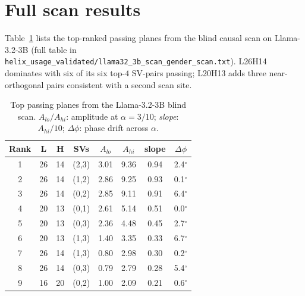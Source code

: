 \section{Full scan results}
\label{app:scan}

Table~\ref{tab:llama_top_planes} lists the top-ranked passing planes
from the blind causal scan on Llama-3.2-3B (full table in
\texttt{helix\_usage\_validated/llama32\_3b\_scan\_gender\_scan.txt}).
L26H14 dominates with six of its six top-$4$ SV-pairs passing; L20H13
adds three near-orthogonal pairs consistent with a second scan site.

\begin{table}[h]
\centering
\small
\caption{Top passing planes from the Llama-3.2-3B blind scan.
$A_{lo}/A_{hi}$: amplitude at $\alpha = 3/10$; \emph{slope}: $A_{hi}/10$;
$\Delta\phi$: phase drift across $\alpha$.}
\label{tab:llama_top_planes}
\begin{tabular}{cccccccc}
\toprule
Rank & L & H & SVs & $A_{lo}$ & $A_{hi}$ & slope & $\Delta\phi$ \\
\midrule
1 & 26 & 14 & (2,3) & 3.01 & 9.36 & 0.94 & 2.4$^\circ$ \\
2 & 26 & 14 & (1,2) & 2.86 & 9.25 & 0.93 & 0.1$^\circ$ \\
3 & 26 & 14 & (0,2) & 2.85 & 9.11 & 0.91 & 6.4$^\circ$ \\
4 & 20 & 13 & (0,1) & 2.61 & 5.14 & 0.51 & 0.0$^\circ$ \\
5 & 20 & 13 & (0,3) & 2.36 & 4.48 & 0.45 & 2.7$^\circ$ \\
6 & 20 & 13 & (1,3) & 1.40 & 3.35 & 0.33 & 6.7$^\circ$ \\
7 & 26 & 14 & (1,3) & 0.80 & 2.98 & 0.30 & 0.2$^\circ$ \\
8 & 26 & 14 & (0,3) & 0.79 & 2.79 & 0.28 & 5.4$^\circ$ \\
9 & 16 & 20 & (0,2) & 1.00 & 2.09 & 0.21 & 0.6$^\circ$ \\
\bottomrule
\end{tabular}
\end{table}
